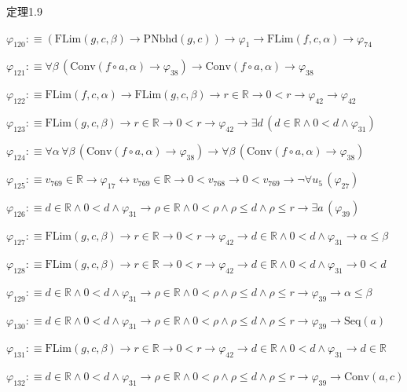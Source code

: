 \begin{fullproof}{定理1.9}
\begin{abbrevlist}
\item $\varphi_{120} :\equiv (\mathrm{FLim}(g,c,\beta) \to \mathrm{PNbhd}(g,c)) \to \varphi_{1} \to \mathrm{FLim}(f,c,\alpha) \to \varphi_{74}$
\item $\varphi_{121} :\equiv \forall \beta\,(\mathrm{Conv}(f \circ a,\alpha) \to \varphi_{38}) \to \mathrm{Conv}(f \circ a,\alpha) \to \varphi_{38}$
\item $\varphi_{122} :\equiv \mathrm{FLim}(f,c,\alpha) \to \mathrm{FLim}(g,c,\beta) \to r \in \mathbb{R} \to 0 < r \to \varphi_{42} \to \varphi_{42}$
\item $\varphi_{123} :\equiv \mathrm{FLim}(g,c,\beta) \to r \in \mathbb{R} \to 0 < r \to \varphi_{42} \to \exists d\,(d \in \mathbb{R} \land 0 < d \land \varphi_{31})$
\item $\varphi_{124} :\equiv \forall \alpha\,\forall \beta\,(\mathrm{Conv}(f \circ a,\alpha) \to \varphi_{38}) \to \forall \beta\,(\mathrm{Conv}(f \circ a,\alpha) \to \varphi_{38})$
\item $\varphi_{125} :\equiv v_{769} \in \mathbb{R} \to \varphi_{17} \leftrightarrow v_{769} \in \mathbb{R} \to 0 < v_{768} \to 0 < v_{769} \to \neg \forall u_{5}\,(\varphi_{27})$
\item $\varphi_{126} :\equiv d \in \mathbb{R} \land 0 < d \land \varphi_{31} \to \rho \in \mathbb{R} \land 0 < \rho \land \rho \leq d \land \rho \leq r \to \exists a\,(\varphi_{39})$
\item $\varphi_{127} :\equiv \mathrm{FLim}(g,c,\beta) \to r \in \mathbb{R} \to 0 < r \to \varphi_{42} \to d \in \mathbb{R} \land 0 < d \land \varphi_{31} \to \alpha \leq \beta$
\item $\varphi_{128} :\equiv \mathrm{FLim}(g,c,\beta) \to r \in \mathbb{R} \to 0 < r \to \varphi_{42} \to d \in \mathbb{R} \land 0 < d \land \varphi_{31} \to 0 < d$
\item $\varphi_{129} :\equiv d \in \mathbb{R} \land 0 < d \land \varphi_{31} \to \rho \in \mathbb{R} \land 0 < \rho \land \rho \leq d \land \rho \leq r \to \varphi_{39} \to \alpha \leq \beta$
\item $\varphi_{130} :\equiv d \in \mathbb{R} \land 0 < d \land \varphi_{31} \to \rho \in \mathbb{R} \land 0 < \rho \land \rho \leq d \land \rho \leq r \to \varphi_{39} \to \mathrm{Seq}(a)$
\item $\varphi_{131} :\equiv \mathrm{FLim}(g,c,\beta) \to r \in \mathbb{R} \to 0 < r \to \varphi_{42} \to d \in \mathbb{R} \land 0 < d \land \varphi_{31} \to d \in \mathbb{R}$
\item $\varphi_{132} :\equiv d \in \mathbb{R} \land 0 < d \land \varphi_{31} \to \rho \in \mathbb{R} \land 0 < \rho \land \rho \leq d \land \rho \leq r \to \varphi_{39} \to \mathrm{Conv}(a,c)$

\end{abbrevlist}
\end{fullproof}
